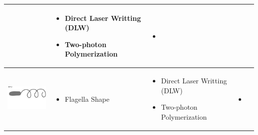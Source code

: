 \documentclass[a4paper,11pt]{article}
\begin{document}
\begin{sloppypar}
\begin{table}[h!]
\begin{tabular}{ c  m{3cm}  m{4.3cm} m{3cm} }
\begin{itemize}
      \end{itemize}
    & 
      \begin{itemize}
        \item Direct Laser Writting (DLW)
	\item Two-photon Polymerization
   
      \end{itemize}
	&
	   \begin{itemize}
        \item \citep{peyer2013magnetic}
   
      \end{itemize}
    \\ \hline

 \begin{minipage}{.3\textwidth}
      \includegraphics[width=\linewidth, height=25mm]{flagella_ta}
    \end{minipage}
    &
      \begin{itemize}
        \item Flagella Shape
      
      \end{itemize}
    & 
      \begin{itemize}
        \item Direct Laser Writting (DLW)
	\item Two-photon Polymerization
   
      \end{itemize}
&
	   \begin{itemize}
        \item \citep{peyer2013bio}
   
      \end{itemize}
    \\ \hline


\end{tabular}
\end{table}
\end{sloppypar}
\end{document}
